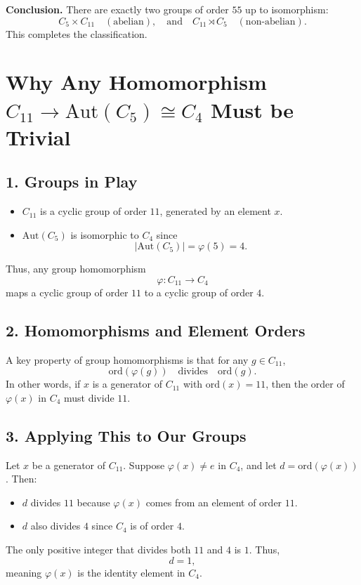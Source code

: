 \documentclass[12pt]{article}
\theoremstyle{definition} %
\theoremstyle{plain} %
\begin{document}
\medskip

\noindent
\textbf{Conclusion.} 
There are exactly two groups of order $55$ up to isomorphism:
\[
C_5 \times C_{11}
\quad (\text{abelian}), 
\quad\text{and}\quad
C_{11} \rtimes C_{5}
\quad (\text{non-abelian}).
\]
This completes the classification.


\section*{Why Any Homomorphism \( C_{11} \to \mathrm{Aut}(C_{5}) \cong C_{4} \) Must be Trivial}

\subsection*{1. Groups in Play}
\begin{itemize}
    \item \(C_{11}\) is a cyclic group of order \(11\), generated by an element \(x\).
    \item \(\mathrm{Aut}(C_{5})\) is isomorphic to \(C_{4}\) since 
    \[
    |\mathrm{Aut}(C_{5})| = \varphi(5) = 4.
    \]
\end{itemize}
Thus, any group homomorphism 
\[
\varphi: C_{11} \to C_{4}
\]
maps a cyclic group of order \(11\) to a cyclic group of order \(4\).

\subsection*{2. Homomorphisms and Element Orders}
A key property of group homomorphisms is that for any \(g \in C_{11}\),
\[
\mathrm{ord}(\varphi(g)) \quad \text{divides} \quad \mathrm{ord}(g).
\]
In other words, if \(x\) is a generator of \(C_{11}\) with \(\mathrm{ord}(x) = 11\), then the order of \(\varphi(x)\) in \(C_{4}\) must divide \(11\).

\subsection*{3. Applying This to Our Groups}
Let \(x\) be a generator of \(C_{11}\). Suppose \(\varphi(x) \neq e\) in \(C_{4}\), and let \(d = \mathrm{ord}(\varphi(x))\). Then:
\begin{itemize}
    \item \(d\) divides \(11\) because \(\varphi(x)\) comes from an element of order \(11\).
    \item \(d\) also divides \(4\) since \(C_{4}\) is of order \(4\).
\end{itemize}
The only positive integer that divides both \(11\) and \(4\) is \(1\). Thus,
\[
d = 1,
\]
meaning \(\varphi(x)\) is the identity element in \(C_{4}\).
\end{document}

